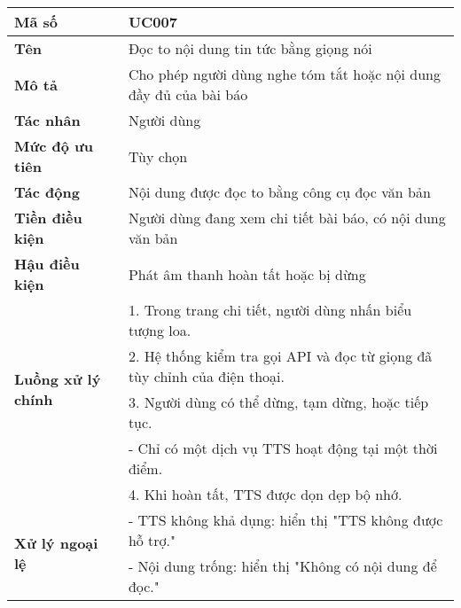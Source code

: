 \begingroup
\renewcommand{\arraystretch}{1.1}
\small
\centering
\noindent
\begin{minipage}{\textwidth}
    \centering
    \begin{tabular}{|m{3cm}|m{9cm}|}
        \hline
        \textbf{Mã số}  & UC007 \\
        \hline
        \textbf{Tên}  & Đọc to nội dung tin tức bằng giọng nói \\
        \hline
        \textbf{Mô tả}  & Cho phép người dùng nghe tóm tắt hoặc nội dung đầy đủ của bài báo \\
        \hline
        \textbf{Tác nhân}  & Người dùng \\
        \hline
        \textbf{Mức độ ưu tiên}  & Tùy chọn \\
        \hline
        \textbf{Tác động}  & Nội dung được đọc to bằng công cụ đọc văn bản \\
        \hline
        \textbf{Tiền điều kiện}  & Người dùng đang xem chi tiết bài báo, có nội dung văn bản \\
        \hline
        \textbf{Hậu điều kiện}  & Phát âm thanh hoàn tất hoặc bị dừng \\
        \hline
        \multirow{4}{*}{\textbf{Luồng xử lý chính}}
            & 1. Trong trang chi tiết, người dùng nhấn biểu tượng loa. \\
            & 2. Hệ thống kiểm tra gọi API và đọc từ giọng đã tùy chỉnh của điện thoại. \\
            & 3. Người dùng có thể dừng, tạm dừng, hoặc tiếp tục. \\
            & - Chỉ có một dịch vụ TTS hoạt động tại một thời điểm. \\
            & 4. Khi hoàn tất, TTS được dọn dẹp bộ nhớ. \\
        \hline
        \multirow{2}{*}{\textbf{Xử lý ngoại lệ}}
            & - TTS không khả dụng: hiển thị "TTS không được hỗ trợ." \\
            & - Nội dung trống: hiển thị "Không có nội dung để đọc." \\
        \hline
    \end{tabular}
\end{minipage}
\endgroup

